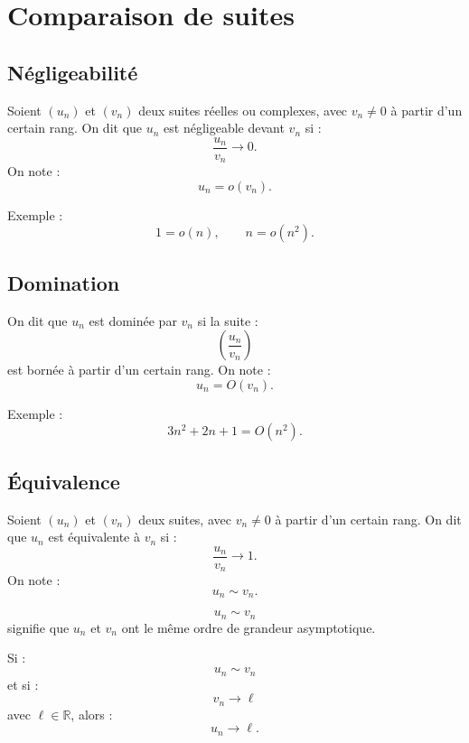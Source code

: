 \documentclass[11pt,a4paper]{article}
\newcommand{\R}{\mathbb R}
\begin{document}
\section{Comparaison de suites}

\subsection{Négligeabilité}

\begin{definitionbox}[Négligeabilité]
Soient \((u_n)\) et \((v_n)\) deux suites réelles ou complexes, avec \(v_n\neq0\) à partir d'un certain rang.  
On dit que \(u_n\) est négligeable devant \(v_n\) si :
\[
\frac{u_n}{v_n}\to0.
\]
On note :
\[
u_n=o(v_n).
\]
\end{definitionbox}

Exemple :
\[
1=o(n),
\qquad
n=o(n^2).
\]

\subsection{Domination}

\begin{definitionbox}[Domination]
On dit que \(u_n\) est dominée par \(v_n\) si la suite :
\[
\left(\frac{u_n}{v_n}\right)
\]
est bornée à partir d'un certain rang.  
On note :
\[
u_n=O(v_n).
\]
\end{definitionbox}

Exemple :
\[
3n^2+2n+1=O(n^2).
\]

\subsection{Équivalence}

\begin{definitionbox}[Équivalence]
Soient \((u_n)\) et \((v_n)\) deux suites, avec \(v_n\neq0\) à partir d'un certain rang.  
On dit que \(u_n\) est équivalente à \(v_n\) si :
\[
\frac{u_n}{v_n}\to1.
\]
On note :
\[
u_n\sim v_n.
\]
\end{definitionbox}

\begin{retenirbox}
\[
u_n\sim v_n
\]
signifie que \(u_n\) et \(v_n\) ont le même ordre de grandeur asymptotique.
\end{retenirbox}

\begin{theorembox}
Si :
\[
u_n\sim v_n
\]
et si :
\[
v_n\to\ell
\]
avec \(\ell\in\R\), alors :
\[
u_n\to\ell.
\]
\end{theorembox}
\end{document}
